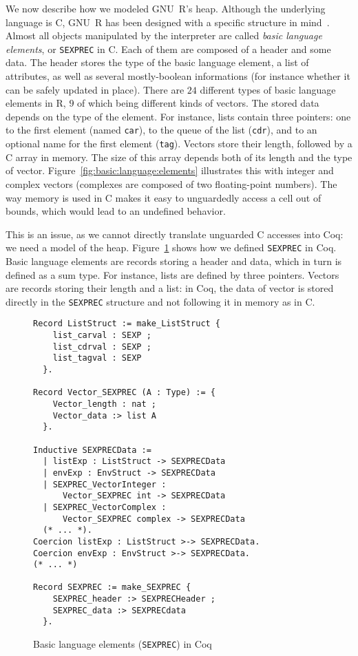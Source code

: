 \documentclass[
    sigplan,
    10pt,
    review, %
    natbib=false %
 ]{acmart}
\begin{document}
We now describe how we modeled GNU~R's heap.
Although the underlying language is C,
GNU~R has been designed with a specific structure in mind~\parencite{R}.
Almost all objects manipulated by the interpreter
are called \emph{basic language elements},
or \texttt{SEXPREC} in C.
Each of them are composed of a header and some data.
%
The header stores the type of the basic language element,
a list of attributes,
as well as several mostly-boolean informations
(for instance whether it can be safely updated in place).
There are \(24\) different types of basic language elements in R,
\(9\) of which being different kinds of vectors.
%
The stored data depends on the type of the element.
For instance, lists contain three pointers:
one to the first element (named \texttt{car}),
to the queue of the list (\texttt{cdr}),
and to an optional name for the first element (\texttt{tag}).
Vectors store their length,
followed by a C array in memory.
The size of this array depends both of its length
and the type of vector.
Figure~\ref{fig:basic:language:elements} illustrates this
with integer and complex vectors
(complexes are composed of two floating-point numbers).
%
The way memory is used in C
makes it easy to unguardedly access a cell out of bounds,
which would lead to an undefined behavior.



This is an issue,
as we cannot directly translate unguarded C accesses into Coq:
we need a model of the heap.
Figure~\ref{fig:SEXPREC} shows how we defined \texttt{SEXPREC} in Coq.
Basic language elements are records storing a header
and data,
which in turn is defined as a sum type.
For instance, lists are defined by three pointers.
Vectors are records storing their length and a list:
in Coq, the data of vector is stored directly in the \texttt{SEXPREC} structure
and not following it in memory as in C.

\begin{figure}
\begin{verbatim}
Record ListStruct := make_ListStruct {
    list_carval : SEXP ;
    list_cdrval : SEXP ;
    list_tagval : SEXP
  }.

Record Vector_SEXPREC (A : Type) := {
    Vector_length : nat ;
    Vector_data :> list A
  }.

Inductive SEXPRECData :=
  | listExp : ListStruct -> SEXPRECData
  | envExp : EnvStruct -> SEXPRECData
  | SEXPREC_VectorInteger :
      Vector_SEXPREC int -> SEXPRECData
  | SEXPREC_VectorComplex :
      Vector_SEXPREC complex -> SEXPRECData
  (* ... *).
Coercion listExp : ListStruct >-> SEXPRECData.
Coercion envExp : EnvStruct >-> SEXPRECData.
(* ... *)

Record SEXPREC := make_SEXPREC {
    SEXPREC_header :> SEXPRECHeader ;
    SEXPREC_data :> SEXPRECdata
  }.
\end{verbatim}
\vspace{-1em}
    \caption{Basic language elements (\texttt{SEXPREC}) in Coq}
    \label{fig:SEXPREC}
\end{figure}
\end{document}
